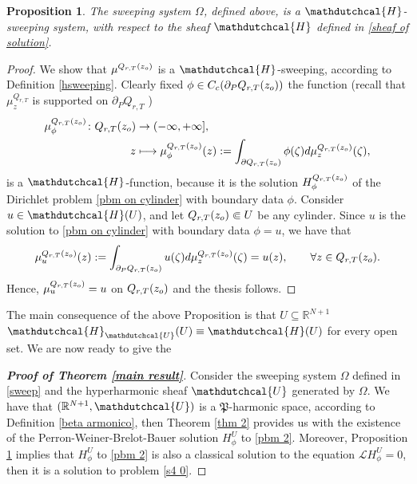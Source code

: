 \documentclass{amsart}
\newtheorem{prop}[thm]{Proposition}
\numberwithin{equation}{section}
\def \p{{\phi}}
\def \Lc{{\mathcal{L}}}
\def \r{{\mathbb{R}}}
\def \Hd{{\mathdutchcal{H}}}
\def \Ud{{\mathdutchcal{U}}}
\begin{document}
{\begin{prop} \label{sec4 prop1}
The sweeping system $\Omega$, defined above, is a $\Hd$-sweeping system, with respect to the sheaf $\Hd$ defined in \textup{\eqref{sheaf of solution}}.
 \end{prop}
\begin{proof}
We show that $\mu^{{Q}_{r,T}(z_{\rm o})}$ is a $\Hd$-sweeping, according to Definition \ref{hsweeping}. Clearly fixed $\p \in {C}_c(\partial_P {Q}_{r,T}(z_{\rm o}))$ the function {(recall that $\mu^{{Q}_{r,T}}_z$ is supported on $\partial_P {{Q}_{r,T}}$ )}
$$
\begin{aligned}
	\mu^{{Q}_{r,T}(z_{\rm o})}_\p  \colon {Q}_{r,T}(z_{\rm o})&\to (-\infty,+\infty],\\
	z & \longmapsto \mu^{{Q}_{r,T}(z_{\rm o})}_\p (z) := \int_{\partial {Q}_{r,T}(z_{\rm o})} \p(\zeta) {\rm d}\mu^{{Q}_{r,T}(z_{\rm o})}_z(\zeta),
\end{aligned}
$$
is a $\Hd$-function, because it is the solution $H^{{Q}_{r,T}(z_{\rm o})}_\p$ of the Dirichlet problem \eqref{pbm on cylinder} with boundary data $\p$. Consider $ u \in \Hd(U)$, and let ${Q}_{r,T}(z_{\rm o}) \Subset U$ be any cylinder. Since $u$ is the solution to \eqref{pbm on cylinder} with boundary data $\p=u$, we have that
$$
\mu^{{Q}_{r,T}(z_{\rm o})}_u(z):=\int_{\partial_P {Q}_{r,T}(z_{\rm o})} u(\zeta) {\rm d}\mu^{{Q}_{r,T}(z_{\rm o})}_z(\zeta) = u(z), \qquad \forall z \in {Q}_{r,T}(z_{\rm o}).
$$
Hence, $\mu^{{Q}_{r,T}(z_{\rm o})}_u = u$ on ${Q}_{r,T}(z_{\rm o})$ and the thesis follows.
\end{proof}

The main consequence of the above Proposition is that  $U \subseteq \r^{N+1}$ $\Hd_{\Ud}(U) \equiv \Hd(U)$ for every open set. We are now ready to give the 

\begin{proof}[\bf Proof of Theorem \ref{main result}] Consider the sweeping system $\Omega$ defined in \eqref{sweep} and the hyperharmonic sheaf $\Ud$ generated by $\Omega$. We have that $(\r^{N+1},\Ud)$ is a $\mathfrak{P}$-harmonic space, according to Definition \ref{beta armonico}, then
Theorem \ref{thm 2} provides us with the existence of the {{Perron-Weiner-Brelot-Bauer}} solution $H^U_\p$ to \eqref{pbm 2}. Moreover, Proposition \ref{sec4 prop1} implies that $H^U_\p$ to \eqref{pbm 2} is also a classical solution to the equation $\Lc H^U_\p =0$, then it is a solution to problem \eqref{s4 0}. 
\end{proof}



}
\end{document}
